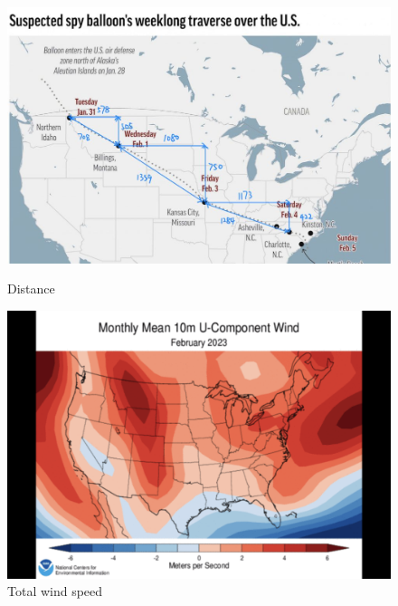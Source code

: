 \documentclass{article}
\begin{document}
\begin{multicols}{2}
\begin{figure}[ht]
\begin{minipage}{0.45\linewidth}
\centering
\includegraphics[width=0.6\linewidth]{graph/distance.png} 
\caption{Distance}
\label{distance}
\end{minipage}
\hfill
\begin{minipage}{0.45\linewidth}
\centering
\includegraphics[width=0.6\linewidth]{graph/windspeed (1).png} 
\caption{Total wind speed}
\label{windspeed1}
\end{minipage}
\end{figure}


\end{multicols}
\end{document}
